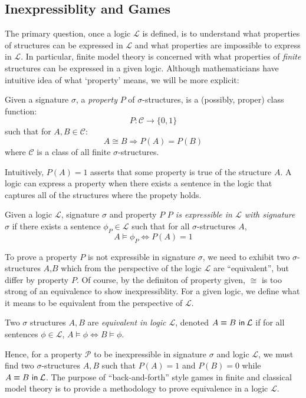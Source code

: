 \subsection{Inexpressiblity and Games}
The primary question, once a logic $\mathcal{L}$ is defined, is to understand what properties of structures can be expressed in $\mathcal{L}$ and what properties are impossible to express in $\mathcal{L}$. In particular, finite model theory is concerned with what properties of \textit{finite} structures can be expressed in a given logic. Although mathematicians have intuitive idea of what `property' means, we will be more explicit:
\begin{defn}
Given a signature $\sigma$, a \textit{property} $P$ of $\sigma$-structures, is a (possibly, proper) class function:
$$P:\mathcal{C} \longrightarrow \{0,1\}$$
such that for $A,B \in \mathcal{C}$:
$$A \cong B \Rightarrow P(A) = P(B)$$ 
where $\mathcal{C}$ is a class of all finite $\sigma$-structures.
\end{defn}
Intuitively, $P(A) = 1$ asserts that some property is true of the structure $A$. A logic can express a property when there exists a sentence in the logic that captures all of the structures where the propety holds. 
\begin{defn}
Given a logic $\mathcal{L}$, signature $\sigma$ and property $P$ \textit{$P$ is expressible in $\mathcal{L}$ with signature $\sigma$} if there exists a sentence $\phi_{P} \in \mathcal{L}$ such that for all $\sigma$-structures $A$,
$$A \vDash \phi_{P} \Leftrightarrow P(A) = 1$$
\end{defn}
To prove a property $P$ is not expressible in signature $\sigma$, we need to exhibit two $\sigma$-structures $A$,$B$ which from the perspective of the logic $\mathcal{L}$ are ``equivalent'', but differ by property $P$. Of course, by the definiton of property given, $\cong$ is too strong of an equivalence to show inexpressiblity. For a given logic, we define what it means to be equivalent from the perspective of $\mathcal{L}$.  
\begin{defn}
Two $\sigma$ structures $A,B$ are \textit{equivalent in logic $\mathcal{L}$}, denoted ${A \equiv B \ \mathsf{in}\: \mathcal{L}}$ if for all sentences $\phi \in \mathcal{L}$, $A \vDash \phi \Leftrightarrow B \vDash \phi$.  
\label{defn:equivLogic}
\end{defn}
Hence, for a property $\mathcal{P}$ to be inexpressible in signature $\sigma$ and logic $\mathcal{L}$, we must find two $\sigma$-structures $A,B$ such that $P(A) = 1$ and $P(B) = 0$ while ${A \equiv B \ \mathsf{in}\: \mathcal{L}}$. The purpose of ``back-and-forth'' style games in finite and classical model theory is to provide a methodology to prove equivalence in a logic $\mathcal{L}$.  
